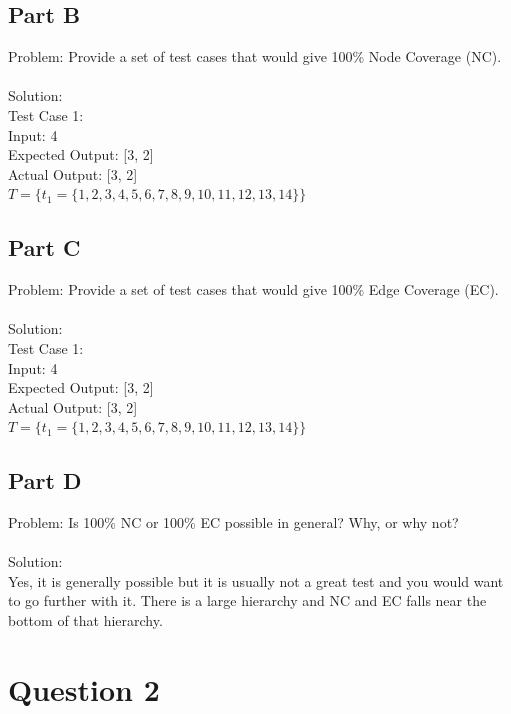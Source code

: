 \documentclass{article}
\begin{document}
\subsection*{Part B}
Problem: Provide a set of test cases that would give 100\% Node Coverage (NC). \\\\
Solution:\\
Test Case 1: \\
Input: 4 \\
Expected Output: [3, 2]\\
Actual Output: [3, 2]\\
$T = \{ t_1 = \{1, 2, 3, 4, 5, 6, 7, 8, 9, 10, 11, 12, 13, 14\}\}$
\subsection*{Part C}
Problem: Provide a set of test cases that would give 100\% Edge Coverage (EC). \\\\
Solution: \\
Test Case 1: \\
Input: 4 \\
Expected Output: [3, 2]\\
Actual Output: [3, 2]\\
$T = \{ t_1 = \{1, 2, 3, 4, 5, 6, 7, 8, 9, 10, 11, 12, 13, 14\}\}$
\subsection*{Part D}
Problem: Is 100\% NC or 100\% EC possible in general? Why, or why not? \\\\
Solution: \\
Yes, it is generally possible but it is usually not a great test and you would want to go further with it. There is a large hierarchy and NC and EC falls near the bottom of that hierarchy. 
\newpage

\section*{Question 2}
\end{document}
